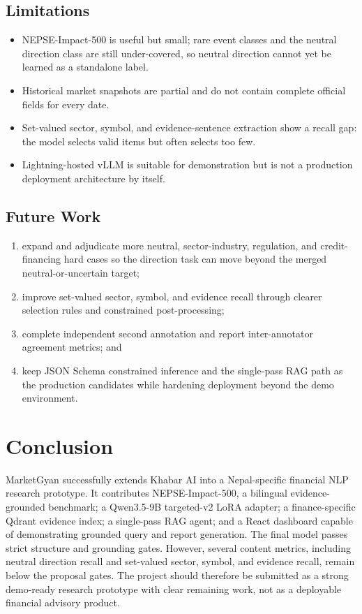 \documentclass[12pt,a4paper]{report}
\begin{document}
\section{Limitations}
\begin{itemize}[leftmargin=1.6em]
    \item NEPSE-Impact-500 is useful but small; rare event classes and the neutral direction class are still under-covered, so neutral direction cannot yet be learned as a standalone label.
    \item Historical market snapshots are partial and do not contain complete official fields for every date.
    \item Set-valued sector, symbol, and evidence-sentence extraction show a recall gap: the model selects valid items but often selects too few.
    \item Lightning-hosted vLLM is suitable for demonstration but is not a production deployment architecture by itself.
\end{itemize}

\section{Future Work}
\begin{enumerate}[leftmargin=1.7em]
    \item expand and adjudicate more neutral, sector-industry, regulation, and credit-financing hard cases so the direction task can move beyond the merged neutral-or-uncertain target;
    \item improve set-valued sector, symbol, and evidence recall through clearer selection rules and constrained post-processing;
    \item complete independent second annotation and report inter-annotator agreement metrics; and
    \item keep JSON Schema constrained inference and the single-pass RAG path as the production candidates while hardening deployment beyond the demo environment.
\end{enumerate}

\chapter{Conclusion}
MarketGyan successfully extends Khabar AI into a Nepal-specific financial NLP research prototype. It contributes NEPSE-Impact-500, a bilingual evidence-grounded benchmark; a Qwen3.5-9B targeted-v2 LoRA adapter; a finance-specific Qdrant evidence index; a single-pass RAG agent; and a React dashboard capable of demonstrating grounded query and report generation. The final model passes strict structure and grounding gates. However, several content metrics, including neutral direction recall and set-valued sector, symbol, and evidence recall, remain below the proposal gates. The project should therefore be submitted as a strong demo-ready research prototype with clear remaining work, not as a deployable financial advisory product.
\end{document}
